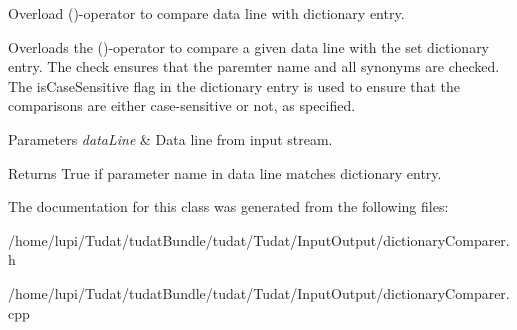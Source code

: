 Overload ()-\/operator to compare data line with dictionary entry. 

Overloads the ()-\/operator to compare a given data line with the set dictionary entry. The check ensures that the paremter name and all synonyms are checked. The is\+Case\+Sensitive flag in the dictionary entry is used to ensure that the comparisons are either case-\/sensitive or not, as specified. 
\begin{DoxyParams}{Parameters}
{\em data\+Line} & Data line from input stream. \\
\hline
\end{DoxyParams}
\begin{DoxyReturn}{Returns}
True if parameter name in data line matches dictionary entry. 
\end{DoxyReturn}


The documentation for this class was generated from the following files\+:\begin{DoxyCompactItemize}
\item 
/home/lupi/\+Tudat/tudat\+Bundle/tudat/\+Tudat/\+Input\+Output/dictionary\+Comparer.\+h\item 
/home/lupi/\+Tudat/tudat\+Bundle/tudat/\+Tudat/\+Input\+Output/dictionary\+Comparer.\+cpp\end{DoxyCompactItemize}
